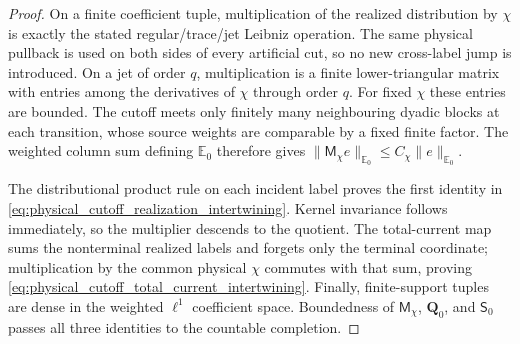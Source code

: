 \documentclass[11pt]{amsart}
\theoremstyle{compactplain}
\theoremstyle{compactdefinition}
\theoremstyle{compactremark}
\begin{document}
\begin{proof}
On a finite coefficient tuple, multiplication of the realized distribution
by \(\chi\) is exactly the stated regular/trace/jet Leibniz operation.  The
same physical pullback is used on both sides of every artificial cut, so no
new cross-label jump is introduced.  On a jet of order \(q\), multiplication
is a finite lower-triangular matrix with entries among the derivatives of
\(\chi\) through order \(q\).  For fixed \(\chi\) these entries are bounded.
The cutoff meets only finitely many neighbouring dyadic blocks at each
transition, whose source weights are comparable by a fixed finite factor.
The weighted column sum defining \(\mathbb E_0\) therefore gives
\(
 \|\mathsf M_\chi e\|_{\mathbb E_0}
 \le C_\chi\|e\|_{\mathbb E_0}.
\)

The distributional product rule on each incident label proves the first
identity in
\eqref{eq:physical_cutoff_realization_intertwining}.  Kernel invariance follows
immediately, so the multiplier descends to the quotient.  The total-current
map sums the nonterminal realized labels and forgets only the terminal
coordinate; multiplication by the common physical \(\chi\) commutes with
that sum, proving
\eqref{eq:physical_cutoff_total_current_intertwining}.  Finally, finite-support
tuples are dense in the weighted \(\ell^1\) coefficient space.  Boundedness of
\(\mathsf M_\chi\), \(\mathbf Q_0\), and \(\mathsf S_0\) passes all three
identities to the countable completion.
\end{proof}
\end{document}
